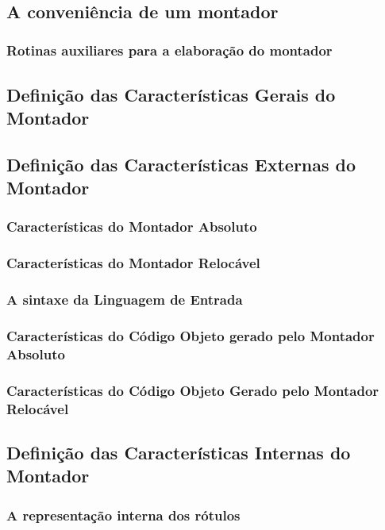 \documentclass[a4paper,12pt]{article}
\begin{document}
\par
\an{[...]}\\

\subsection{A conveniência de um montador}

\subsubsection{Rotinas auxiliares para a elaboração do montador}

\subsection{Definição das Características Gerais do Montador}

\subsection{Definição das Características Externas do Montador}

\subsubsection{Características do Montador Absoluto}
\subsubsection{Características do Montador Relocável}
\subsubsection{A sintaxe da Linguagem de Entrada}
\subsubsection{Características do Código Objeto gerado pelo Montador Absoluto}
\subsubsection{Características do Código Objeto Gerado pelo Montador Relocável}

\subsection{Definição das Características Internas do Montador}

\subsubsection{A representação interna dos rótulos}
\end{document}
